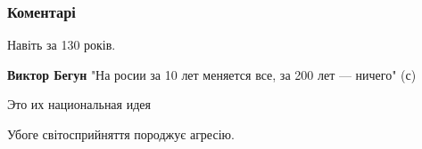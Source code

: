  
 
 
 
 
\subsubsection{Коментарі}
\label{sec:01_08_2021.fb.gaj_miroslav.1.statja_putin_otvet.cmt}

\begin{itemize}
 
Навіть за 130 років.
\begin{itemize}
 
\textbf{Виктор Бегун} "На росии за 10 лет меняется все, за 200 лет — ничего" (с)
\end{itemize}

 
Это их национальная идея🤣

 
Убоге світосприйняття породжує агресію.

 

\end{itemize}
